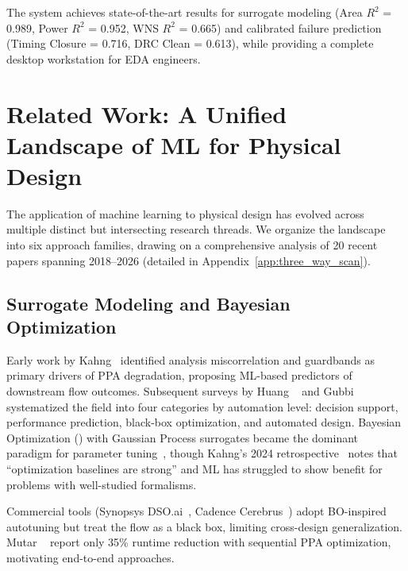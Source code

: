 \documentclass[10pt,conference]{IEEEtran}
\newcommand{\Rtwo}{$R^2$}
\newcommand{\BO}{\text{BO}}
\newcommand{\AUC}{\text{AUC}}
\begin{document}
The system achieves state-of-the-art results for surrogate modeling (Area \Rtwo{} = 0.989, Power \Rtwo{} = 0.952, WNS \Rtwo{} = 0.665) and calibrated failure prediction (Timing Closure \AUC{} = 0.716, DRC Clean \AUC{} = 0.613), while providing a complete desktop workstation for EDA engineers.


\section{Related Work: A Unified Landscape of ML for Physical Design}
\label{sec:related_work}

The application of machine learning to physical design has evolved across multiple distinct but intersecting research threads. We organize the landscape into six approach families, drawing on a comprehensive analysis of 20 recent papers spanning 2018--2026 (detailed in Appendix~\ref{app:three_way_scan}).

\subsection{Surrogate Modeling and Bayesian Optimization}
\label{sec:surrogate_bo}

Early work by Kahng~\cite{kahng2018machine} identified analysis miscorrelation and guardbands as primary drivers of PPA degradation, proposing ML-based predictors of downstream flow outcomes. Subsequent surveys by Huang \etal~\cite{huang2021machine} and Gubbi \etal~\cite{gubbi2022survey} systematized the field into four categories by automation level: decision support, performance prediction, black-box optimization, and automated design. Bayesian Optimization (\BO{}) with Gaussian Process surrogates became the dominant paradigm for parameter tuning~\cite{mutar2026auto, kahng2024solvers}, though Kahng's 2024 retrospective~\cite{kahng2024solvers} notes that ``optimization baselines are strong'' and ML has struggled to show benefit for problems with well-studied formalisms.

Commercial tools (Synopsys DSO.ai~\cite{verma2024dso}, Cadence Cerebrus~\cite{agnesina2020vlsi}) adopt BO-inspired autotuning but treat the flow as a black box, limiting cross-design generalization. Mutar \etal~\cite{mutar2026auto} report only 35\% runtime reduction with sequential PPA optimization, motivating end-to-end approaches.
\end{document}

